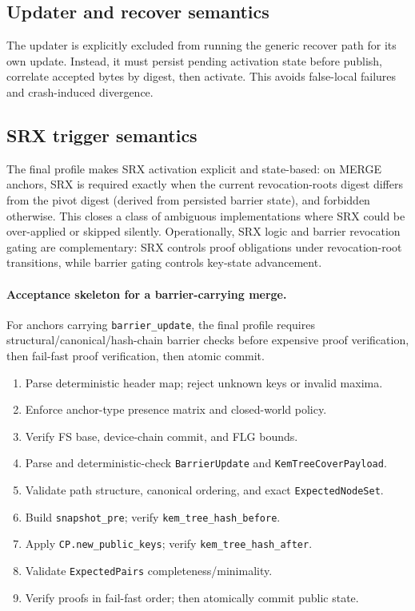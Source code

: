\documentclass[11pt]{article}
\begin{document}
\subsection{Updater and recover semantics}
The updater is explicitly excluded from running the generic recover path for its own update. Instead, it must persist pending activation state before publish, correlate accepted bytes by digest, then activate. This avoids false-local failures and crash-induced divergence.

\subsection{SRX trigger semantics}
The final profile makes SRX activation explicit and state-based: on MERGE anchors, SRX is required exactly when the current revocation-roots digest differs from the pivot digest (derived from persisted barrier state), and forbidden otherwise. This closes a class of ambiguous implementations where SRX could be over-applied or skipped silently. Operationally, SRX logic and barrier revocation gating are complementary: SRX controls proof obligations under revocation-root transitions, while barrier gating controls key-state advancement.

\paragraph{Acceptance skeleton for a barrier-carrying merge.}
For anchors carrying \texttt{barrier\_update}, the final profile requires structural/canonical/hash-chain barrier checks before expensive proof verification, then fail-fast proof verification, then atomic commit.
\begin{enumerate}
  \item Parse deterministic header map; reject unknown keys or invalid maxima.
  \item Enforce anchor-type presence matrix and closed-world policy.
  \item Verify FS base, device-chain commit, and FLG bounds.
  \item Parse and deterministic-check \texttt{BarrierUpdate} and \texttt{KemTreeCoverPayload}.
  \item Validate path structure, canonical ordering, and exact \texttt{ExpectedNodeSet}.
  \item Build \texttt{snapshot\_pre}; verify \texttt{kem\_tree\_hash\_before}.
  \item Apply \texttt{CP.new\_public\_keys}; verify \texttt{kem\_tree\_hash\_after}.
  \item Validate \texttt{ExpectedPairs} completeness/minimality.
  \item Verify proofs in fail-fast order; then atomically commit public state.
\end{enumerate}
\end{document}
